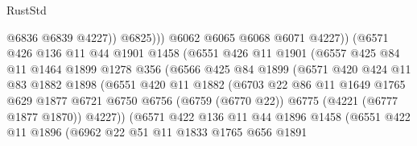 \begin{lexlean}{RustStd}
\begin{coremodule}
{\begin{coremodule}
{{{{{{{{{{{{{{{{{{{{{{{{{{{{{{{                                @6836
                                @6839
                                @4227))
                            @6825)))
                      @6062
                      @6065
                      @6068
                      @6071
                      @4227))
                  (@6571
                    @426
                    @136
                    @11
                    @44
                    @1901
                    @1458
                    (@6551
                      @426
                      @11
                      @1901
                      (@6557
                        @425
                        @84
                        @11
                        @1464
                        @1899
                        @1278
                        @356
                        (@6566
                          @425
                          @84
                          @1899
                          (@6571
                            @420
                            @424
                            @11
                            @83
                            @1882
                            @1898
                            (@6551
                              @420
                              @11
                              @1882
                              (@6703
                                @22
                                @86
                                @11
                                @1649
                                @1765
                                @629
                                @1877
                                @6721
                                @6750
                                @6756
                                (@6759 (@6770 @22))
                                @6775
                                (@4221 (@6777 @1877 @1870))
                                @4227))
                            (@6571
                              @422
                              @136
                              @11
                              @44
                              @1896
                              @1458
                              (@6551
                                @422
                                @11
                                @1896
                                (@6962
                                  @22
                                  @51
                                  @11
                                  @1833
                                  @1765
                                  @656
                                  @1891
}}}}}}}}}}}}}}}}}}}}}}}}}}}}}}}
\end{coremodule}}
\end{coremodule}
\end{lexlean}
